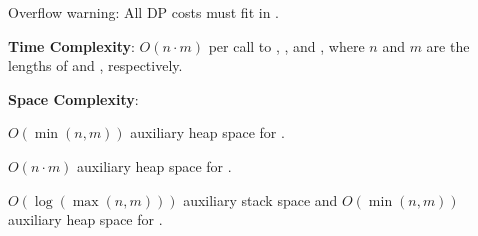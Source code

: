 Overflow warning: All DP costs must fit in .

\textbf{Time Complexity}: $O(n \cdot m)$ per call to , , and , where $n$ and $m$ are the lengths of  and , respectively.

\textbf{Space Complexity}:
\begin{compactitem}
  \item $O(\min\left(n, m\right))$ auxiliary heap space for .
  \item $O(n \cdot m)$ auxiliary heap space for .
  \item $O(\log\left(\max\left(n, m\right)\right))$ auxiliary stack space and $O(\min\left(n, m\right))$ auxiliary heap space for .
\end{compactitem}

